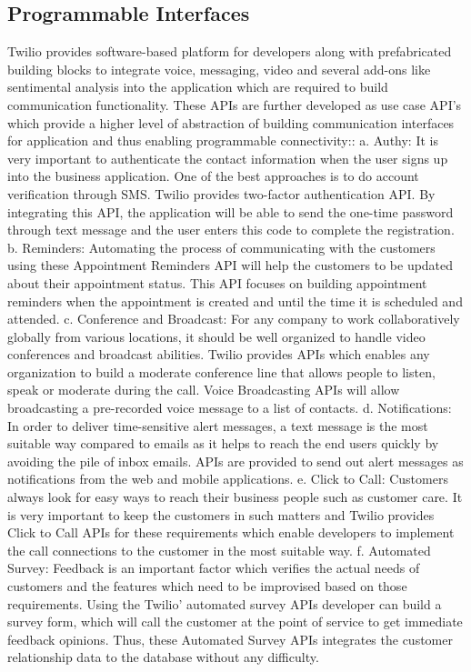 \subsection{Programmable Interfaces}

Twilio provides software-based platform for developers along with 
prefabricated building blocks to integrate voice, messaging, video and 
several add-ons like sentimental analysis into the application which are 
required to build communication functionality. These APIs are further developed 
as use case API’s which provide a higher level of abstraction of building 
communication interfaces for application and thus enabling programmable 
connectivity::
a. Authy: It is very important to authenticate the contact information when the 
user signs up into the business application. One of the best approaches is to do
account verification through SMS. Twilio provides two-factor authentication API.
By integrating this API, the application will be able to send the one-time 
password through text message and the user enters this code to complete the 
registration.  
b. Reminders: Automating the process of communicating with the customers using 
these Appointment Reminders API will help the customers to be updated about 
their appointment status. This API focuses on building appointment reminders 
when the appointment is created and until the time it is scheduled and attended.
c. Conference and Broadcast:
For any company to work collaboratively globally from various locations, it 
should be well organized to handle video conferences and broadcast abilities. 
Twilio provides APIs which enables any organization to build a moderate 
conference line that allows people to listen, speak or moderate during the call.
Voice Broadcasting APIs will allow broadcasting a pre-recorded voice message to 
a list of contacts.
d. Notifications:
In order to deliver time-sensitive alert messages, a text message is the most 
suitable way compared to emails as it helps to reach the end users quickly by 
avoiding the pile of inbox emails. APIs are provided to send out alert messages
as notifications from the web and mobile applications.
e. Click to Call:
Customers always look for easy ways to reach their business people such as 
customer care. It is very important to keep the customers in such matters and 
Twilio provides Click to Call APIs for these requirements which enable 
developers to implement the call connections to the customer in the most 
suitable way.
f. Automated Survey:
Feedback is an important factor which verifies the actual needs of customers and
the features which need to be improvised based on those requirements. Using the
Twilio’ automated survey APIs developer can build a survey form, which will
call the customer at the point of service to get immediate feedback opinions. 
Thus, these Automated Survey APIs integrates the customer relationship data to
the database without any difficulty.

